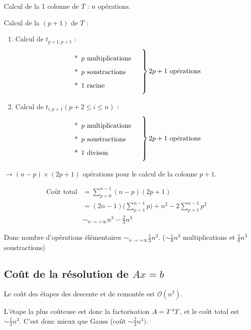 Calcul de la 1 colonne de $T$ : $n$ opérations.

Calcul de la $(p+1)$ de $T$ :

\begin{enumerate}[label=-]
    \item Calcul de $t_{p+1,p+1}$ :
        \[
            \left.
            \parbox{4cm}{
                \begin{enumerate}[label=*]
                    \item $p$ multiplications
                    \item $p$ soustractions
                    \item $1$ racine
                \end{enumerate}
            }\right\rbrace \text{$2p+1$ opérations}
        \]

    \item Calcul de $t_{i,p+1} (p+2 \leq i \leq n)$ :
        \[
            \left.
            \parbox{4cm}{
                \begin{enumerate}[label=*]
                    \item $p$ multiplications
                    \item $p$ soustractions
                    \item $1$ divison
                \end{enumerate}
            }\right\rbrace \text{$2p+1$ opérations}
        \]
\end{enumerate}

$\to (n-p) \times (2p+1)$ opérations pour le calcul de la colonne $p+1$.

\begin{align*}
    \text{Coût total} & = \sum_{p=0}^{n-1} (n-p)(2p+1) \\
    & = (2n-1) \Bigg( \sum_{p=1}^{n-1}p \Bigg) + n^2 - 2 \sum_{p=1}^{n-1} p^2 \\
    & \sim_{n \to + \infty} n^3 - \frac{2}{3} n^3
\end{align*} 

Donc nombre d'opérations élémentaires $\sim_{n \to +\infty} \frac{1}{3}n^3$.
($\sim \frac{1}{6}n^3$ multiplications et $\frac{1}{6}n^3$ soustractions)


\subsection*{Coût de la résolution de $Ax = b$}

Le coût des étapes des descente et de remontée est $\mathcal{O}(n^2)$.

L'étape la plus coûteuse est donc la factorisation $A = T \,^tT$, et le coût total est $\sim \frac{1}{3}n^3$. C'est donc mieux que Gauss (coût $\sim \frac{2}{3}n^3)$.





